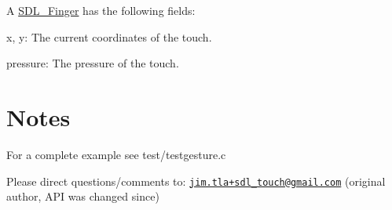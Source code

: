 A \mbox{\hyperlink{struct_s_d_l___finger}{S\+D\+L\+\_\+\+Finger}} has the following fields\+:
\begin{DoxyItemize}
\item x, y\+: The current coordinates of the touch.
\item pressure\+: The pressure of the touch.
\end{DoxyItemize}



 \section*{Notes }

For a complete example see test/testgesture.\+c

Please direct questions/comments to\+: \href{mailto:jim.tla+sdl_touch@gmail.com}{\tt jim.\+tla+sdl\+\_\+touch@gmail.\+com} (original author, A\+PI was changed since) 